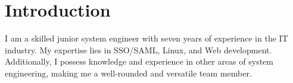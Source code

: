 \section{Introduct\textcolor{mycolor}{ion}}
\begin{center}
  I am a skilled junior \textcolor{mycolor}{system engineer} with seven years of experience in the \textcolor{mycolor}{IT} industry.
  My expertise lies in \textcolor{mycolor}{SSO/SAML, Linux, and Web development}. Additionally, 
  I possess knowledge and experience in other areas of system engineering, making me a well-rounded and versatile team member.
\end{center}

